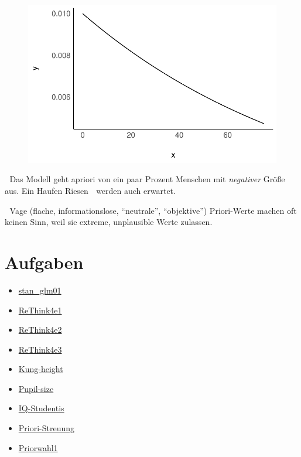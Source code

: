 \documentclass[
  a4paper,
  DIV=11]{scrreprt}
\providecommand{\tightlist}{%
  \setlength{\itemsep}{0pt}\setlength{\parskip}{0pt}}\usepackage{longtable,booktabs,array}
\theoremstyle{definition}
\theoremstyle{remark}
\begin{document}
\begin{figure}[H]

{\centering \includegraphics{./gauss_files/figure-pdf/Kung-3-1.pdf}

}

\end{figure}

🤔 Das Modell geht apriori von ein paar Prozent Menschen mit
\emph{negativer} Größe aus. Ein Haufen Riesen 👹 werden auch erwartet.

🤯 Vage (flache, informationslose, ``neutrale'', ``objektive'')
Priori-Werte machen oft keinen Sinn, weil sie extreme, unplausible Werte
zulassen.

\hypertarget{aufgaben-6}{%
\section{Aufgaben}\label{aufgaben-6}}

\begin{itemize}
\tightlist
\item
  \href{https://datenwerk.netlify.app/posts/stan_glm01/stan_glm01.html}{stan\_glm01}
\item
  \href{https://datenwerk.netlify.app/posts/rethink4e1/rethink4e1}{ReThink4e1}
\item
  \href{https://datenwerk.netlify.app/posts/rethink4e2/rethink4e2}{ReThink4e2}
\item
  \href{https://datenwerk.netlify.app/posts/rethink4e3/rethink4e3}{ReThink4e3}
\item
  \href{https://datenwerk.netlify.app/posts/kung-height/kung-height}{Kung-height}
\item
  \href{https://datenwerk.netlify.app/posts/pupil-size/pupil-size}{Pupil-size}
\item
  \href{https://datenwerk.netlify.app/posts/iq-studentis/iq-studentis}{IQ-Studentis}
\item
  \href{https://datenwerk.netlify.app/posts/priori-streuung/priori-streuung}{Priori-Streuung}
\item
  \href{https://datenwerk.netlify.app/posts/priorwahl1/priorwahl1}{Priorwahl1}
\end{itemize}
\end{document}

